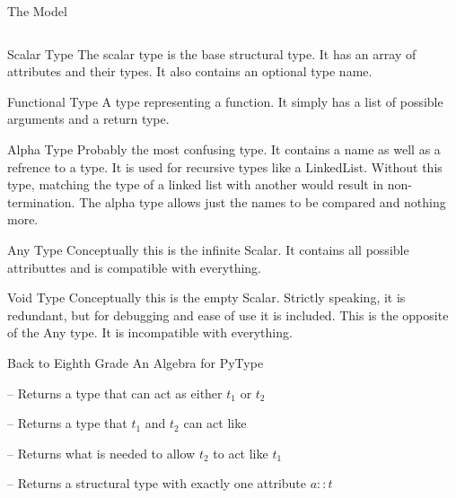 \documentclass[12pt,t]{beamer}
\newcommand{\subt}[1]{{\footnotesize \color{subtitle} {#1}}}
\newcommand{\vitem}{\vfill\item}
\begin{document}
\begin{frame}{The Model}
    \inputminted{haskell}{code/model.hs}
\end{frame}

\begin{frame}{Scalar Type}
    \vfill
    The scalar type is the base structural type. It
    has an array of attributes and their types. It also
    contains an optional type name.
    \vfill
\end{frame}

\begin{frame}{Functional Type}
    \vfill
    A type representing a function. It simply has a list
    of possible arguments and a return type.
    \vfill
\end{frame}

\begin{frame}{Alpha Type}
    \vfill
    Probably the most confusing type. It contains a name as well
    as a refrence to a type. It is used for recursive types like
    a LinkedList. Without this type, matching the type of a linked
    list with another would result in non-termination. The alpha
    type allows just the names to be compared and nothing more.
    \vfill
\end{frame}

\begin{frame}{Any Type}
    \vfill
    Conceptually this is the infinite Scalar. It contains all
    possible attributtes and is compatible with everything.
    \vfill
\end{frame}

\begin{frame}{Void Type}
    \vfill
    Conceptually this is the empty Scalar. Strictly speaking, it
    is redundant, but for debugging and ease of use it is included.
    This is the opposite of the Any type. It is incompatible with everything.
    \vfill
\end{frame}

\begin{frame}{Back to Eighth Grade}
    \subt{An Algebra for PyType}

    \begin{description}
        \vitem[Union $t_1$ $t_2$] -- Returns a type that can act as either $t_1$ or $t_2$
        \vitem[Intersection $t_1$ $t_2$] -- Returns a type that $t_1$ and $t_2$ can act like
        \vitem[Difference $t_1$ $t_2$] -- Returns what is needed to allow $t_2$ to act like $t_1$
        \vitem[Singleton $a$ $t$] -- Returns a structural type with exactly one attribute $a::t$
    \end{description}
\end{frame}
\end{document}

